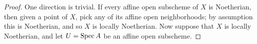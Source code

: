 \begin{proof}
	One direction is trivial. If every affine open subscheme of $X$ is Noetherian, then given a point of $X$, pick any of its affine open neighborhoods; by assumption this is Noetherian, and so $X$ is locally Noetherian. Now suppose that $X$ is locally Noetherian, and let $U = \operatorname{Spec} A$ be an affine open subscheme.
\end{proof}
